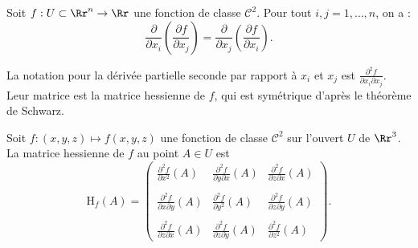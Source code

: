 \documentclass[class=report,crop=false]{standalone}
\begin{document}
\vskip6mm

\begin{theoreme}Soit $f:U\subset \Rr^n\to \Rr$ une fonction de classe ${\mathscr C}^2$. Pour tout $i,j=1,\dots ,n$, on a :
$$\frac{\partial}{\partial x_i}\left(\frac{\partial f}{\partial x_j}\right)=\frac{\partial}{\partial x_j}\left(\frac{\partial f}{\partial x_i}\right).$$
\end{theoreme}

\vskip4mm

\noindent La notation pour la dérivée partielle seconde par rapport à $x_i$ et $x_j$ est $\displaystyle \frac{\partial ^2f}{\partial x_i\partial x_j}$. Leur matrice est la matrice hessienne de $f$, qui est symétrique d'après le théorème de Schwarz.

\vskip6mm

\begin{definition}Soit $f:(x,y,z)\mapsto f(x,y,z)$ une fonction de classe $\mathscr{C}^2$ sur l'ouvert $U$ de $\Rr^3$. La matrice hessienne de $f$ au point $A\in U$ est
$$\mbox{H}_f(A)=\left(\begin{array}{ccc}\displaystyle \frac{\partial ^2f}{\partial x^2}(A)&\displaystyle \frac{\partial ^2f}{\partial y\partial x}(A)&\displaystyle \frac{\partial ^2f}{\partial z\partial x}(A)\\ \\ \displaystyle \frac{\partial ^2f}{\partial x\partial y}(A)&\displaystyle \frac{\partial ^2f}{\partial y^2}(A)&\displaystyle \frac{\partial ^2f}{\partial z\partial y}(A)\\ \\ \displaystyle \frac{\partial ^2f}{\partial z\partial x}(A)&\displaystyle \frac{\partial ^2f}{\partial z\partial y}(A)&\displaystyle \frac{\partial ^2f}{\partial z^2}(A)\end{array}\right).$$
\end{definition}

\vskip6mm
\end{document}
